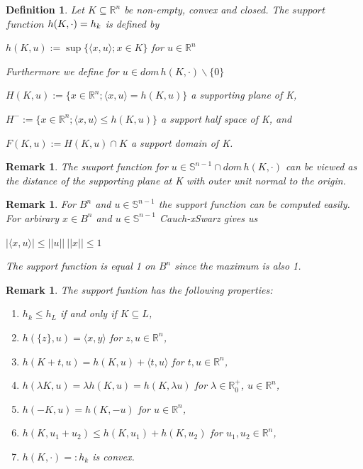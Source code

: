\documentclass[a4paper]{book}
\newtheorem{remark}[theorem]{Remark}%
\newtheorem{definition}[theorem]{Definition}%
\numberwithin{theorem}{section}%
\begin{document}
\begin{definition}
    Let $K\subseteq\mathbb{R}^n$ be non-empty, convex and closed. The $support$ $function$ $h(K,\cdot\space)=h_k$ is defined by
    \begin{center}
        $h(K,u):=\sup\{\langle x,u\rangle;x\in K\}$ for $u\in\mathbb{R}^n$
    \end{center}
    Furthermore we define for $u\in dom\,h(K,\cdot)\backslash\{0\}$
    \begin{center}
        $H(K,u):=\{x\in\mathbb{R}^n;\langle x,u\rangle=h(K,u)\}$ a supporting plane of K,
        
        $H^{-}:=\{x\in\mathbb{R}^n;\langle x,u\rangle\leq h(K,u)\}$ a support half space of K, and 
        
        $F(K,u):=H(K,u)\cap K$ a support domain of K.
    \end{center}
\end{definition}

\begin{remark}
    The suuport function for $u\in\mathbb{S}^{n-1}\cap dom\,h(K,\cdot)$ can be viewed as the distance of the supporting plane at K with outer unit normal to the origin.
\end{remark}

\begin{remark}
    For $B^{n}$ and $u\in\mathbb{S}^{n-1}$ the support function can be computed easily. For arbirary $x\in B^{n}$ and $u\in\mathbb{S}^{n-1}$ Cauch-xSwarz gives us
    \begin{center}
        $|\langle x,u\rangle|\leq||u||\:||x||\leq1$
    \end{center}
    The support function is equal 1 on $B^{n}$ since the maximum is also 1.
\end{remark}

\begin{remark}
    The support funtion has the following properties:
    \begin{enumerate}
        \item $h_{k}\leq h_{L}$ if and only if $K\subseteq L$,
        \item $h(\{z\},u)=\langle x,y\rangle$ for $z,u\in\mathbb{R}^{n}$,
        \item $h(K+t,u)=h(K,u)+\langle t,u\rangle$ for $t,u\in\mathbb{R}^{n}$,
        \item $h(\lambda K, u)=\lambda h(K,u)=h(K,\lambda u)$ for $\lambda\in\mathbb{R}_{0}^{+}$, $u\in\mathbb{R}^{n}$,
        \item $h(-K,u)=h(K,-u)$ for $u\in\mathbb{R}^{n}$,
        \item $h(K,u_{1}+u_{2})\leq h(K,u_{1})+h(K,u_{2})$ for $u_{1},u_{2}\in\mathbb{R}^{n}$,
        \item $h(K,\cdot)=: h_{k}$ is convex.
    \end{enumerate}
\end{remark}
\end{document}
